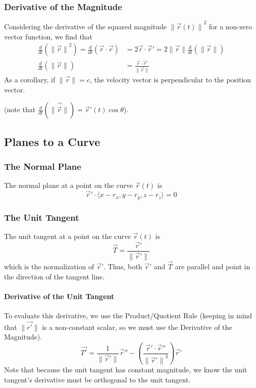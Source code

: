 \documentclass{article}
\newcommand{\vect}[1]{\ensuremath{\overrightarrow{#1}}}
\newcommand{\magnitude}[1]{\ensuremath{\lVert #1 \rVert}}
\newcommand{\magvect}[1]{\magnitude{\vect{#1}}}
\begin{document}
\subsubsection{Derivative of the Magnitude}
Considering the derivative of the squared magnitude $\magnitude{\vect{r}(t)}^2$ for a non-zero vector function, we find that
\begin{align*}
    \frac{d}{dt}\left(\magnitude{\vect{r}}^2\right) = \frac{d}{dt}\left(\vect{r}\cdot\vect{r}\right) &= 2\vect{r}\cdot\vect{r}' = 2\magvect{r}\frac{d}{dt}\left(\magvect{r}\right)\\
    \frac{d}{dt}\left(\magvect{r}\right) &= \frac{\vect{r}\cdot\vect{r}'}{\magvect{r}}
\end{align*}
As a corollary, if $\magvect{r}=c$, the velocity vector is perpendicular to the position vector.

(note that $\frac{d}{dt}\left(\magvect{\vect{r}}\right) = \vect{r}'(t)\cos{\theta}$).

\subsection{Planes to a Curve}
\subsubsection{The Normal Plane}
The normal plane at a point on the curve $\vect{r}(t)$ is
$$\vect{r}' \cdot\langle x - r_x, y - r_y, z - r_z\rangle = 0$$

\subsubsection{The Unit Tangent}
The unit tangent at a point on the curve $\vect{r}(t)$ is $$\vect{T}=\frac{\vect{r}'}{\magnitude{\vect{r}'}}$$ which is the normalization of $\vect{r}'$.
Thus, both $\vect{r}'$ and $\vect{T}$ are parallel and point in the direction of the tangent line.

\paragraph{Derivative of the Unit Tangent}
To evaluate this derivative, we use the Product/Quotient Rule (keeping in mind that $\magvect{r'}$ is a non-constant scalar, so we must use the Derivative of the Magnitude).
$$\vect{T'}=\frac{1}{\magnitude{\vect{r}'}}\vect{r}''-\left(\frac{\vect{r}'\cdot\vect{r}''}{\magnitude{\vect{r}'}^3}\right)\vect{r}'$$
Note that because the unit tangent has constant magnitude, we know the unit tangent's derivative must be orthogonal to the unit tangent.
\end{document}
